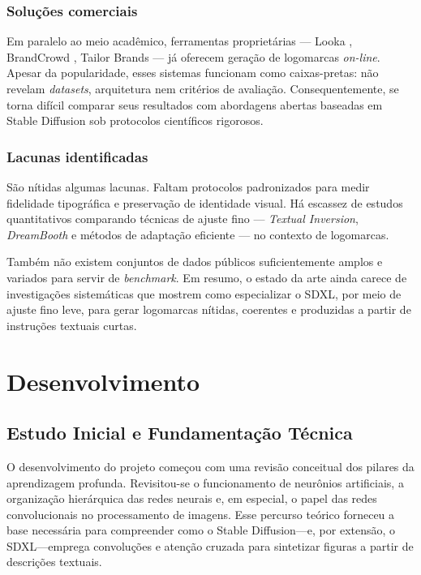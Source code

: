 \documentclass[12pt, %
openright, 
oneside, %
a4paper,    %
brazil]{facom-ufu-abntex2}
\begin{document}
\subsection{Soluções comerciais}

Em paralelo ao meio acadêmico, ferramentas proprietárias — Looka \cite{looka}, BrandCrowd \cite{brandcrowd}, Tailor Brands \cite{tailorbrands} — já oferecem geração de logomarcas \textit{on-line}. Apesar da popularidade, esses sistemas funcionam como caixas-pretas: não revelam \emph{datasets}, arquitetura nem critérios de avaliação. Consequentemente, se torna difícil comparar seus resultados com abordagens abertas baseadas em Stable Diffusion sob protocolos científicos rigorosos.

\subsection{Lacunas identificadas}

São nítidas algumas lacunas. Faltam protocolos padronizados para medir fidelidade tipográfica e preservação de identidade visual. Há escassez de estudos quantitativos comparando técnicas de ajuste fino — \emph{Textual Inversion}, \emph{DreamBooth} e métodos de adaptação eficiente — no contexto de logomarcas.

Também não existem conjuntos de dados públicos suficientemente amplos e variados para servir de \textit{benchmark}. Em resumo, o estado da arte ainda carece de investigações sistemáticas que mostrem como especializar o SDXL, por meio de ajuste fino leve, para gerar logomarcas nítidas, coerentes e produzidas a partir de instruções textuais curtas.



\chapter{Desenvolvimento}

\section{Estudo Inicial e Fundamentação Técnica}

O desenvolvimento do projeto começou com uma revisão conceitual dos pilares da aprendizagem profunda. Revisitou-se o funcionamento de neurônios artificiais, a organização hierárquica das redes neurais e, em especial, o papel das redes convolucionais no processamento de imagens. Esse percurso teórico forneceu a base necessária para compreender como o Stable Diffusion—e, por extensão, o SDXL—emprega convoluções e atenção cruzada para sintetizar figuras a partir de descrições textuais.
\end{document}
